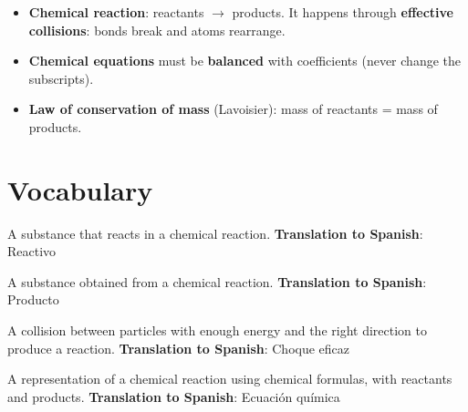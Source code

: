 \begin{itemize}
    \item \textbf{Chemical reaction}: reactants \(\to\) products. It happens through \textbf{effective collisions}: bonds break and atoms rearrange.
    \item \textbf{Chemical equations} must be \textbf{balanced} with coefficients (never change the subscripts).
    \item \textbf{Law of conservation of mass} (Lavoisier): mass of reactants = mass of products.
\end{itemize}

\section{Vocabulary}

\begin{vocabulary}[Reactant]
    A substance that reacts in a chemical reaction. \newline
    \textbf{Translation to Spanish}: Reactivo
\end{vocabulary}

\begin{vocabulary}[Product]
    A substance obtained from a chemical reaction. \newline
    \textbf{Translation to Spanish}: Producto
\end{vocabulary}

\begin{vocabulary}
    A collision between particles with enough energy and the right direction to produce a reaction. \newline
    \textbf{Translation to Spanish}: Choque eficaz
\end{vocabulary}

\begin{vocabulary}
    A representation of a chemical reaction using chemical formulas, with reactants and products. \newline
    \textbf{Translation to Spanish}: Ecuación química
\end{vocabulary}

